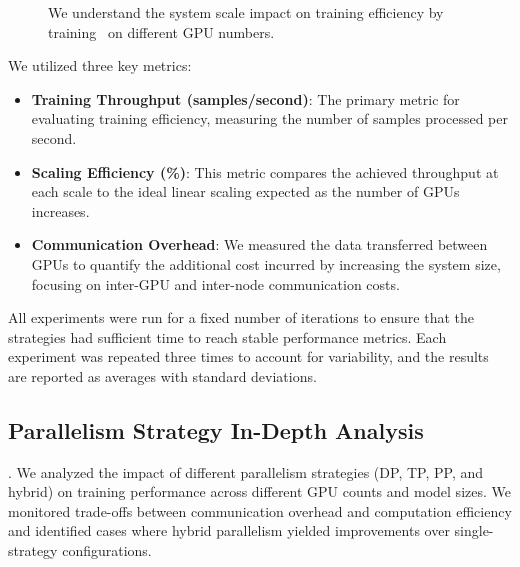 \begin{figure*}[htbp]
  \centering
  \caption{
  We understand the system scale impact on training efficiency by training \sysname\ on different GPU numbers.
  }
  \label{fig:ablation:scale}
\end{figure*}

We utilized three key metrics:
\begin{itemize}[noitemsep,topsep=1pt, leftmargin=*]
    \item \textbf{Training Throughput (samples/second)}: The primary metric for evaluating training efficiency, measuring the number of samples processed per second.
    \item \textbf{Scaling Efficiency (\%)}: This metric compares the achieved throughput at each scale to the ideal linear scaling expected as the number of GPUs increases.
    \item \textbf{Communication Overhead}: We measured the data transferred between GPUs to quantify the additional cost incurred by increasing the system size, focusing on inter-GPU and inter-node communication costs.
\end{itemize}

All experiments were run for a fixed number of iterations to ensure that the strategies had sufficient time to reach stable performance metrics. Each experiment was repeated three times to account for variability, and the results are reported as averages with standard deviations.

\subsection{Parallelism Strategy In-Depth Analysis}

. We analyzed the impact of different parallelism strategies (DP, TP, PP, and hybrid) on training performance across different GPU counts and model sizes. We monitored trade-offs between communication overhead and computation efficiency and identified cases where hybrid parallelism yielded improvements over single-strategy configurations.

